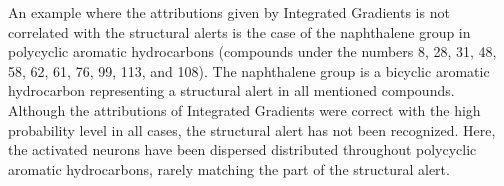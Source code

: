 An example where the attributions given by Integrated Gradients is not correlated with the structural alerts is the case of the naphthalene group in polycyclic aromatic hydrocarbons (compounds under the numbers 8, 28, 31, 48, 58, 62, 61, 76, 99, 113, and 108). The naphthalene group is a bicyclic aromatic hydrocarbon representing a structural alert in all mentioned compounds. Although the attributions of Integrated Gradients were correct with the high probability level in all cases, the structural alert has not been recognized. Here, the activated neurons have been dispersed distributed throughout polycyclic aromatic hydrocarbons, rarely matching the part of the structural alert.
